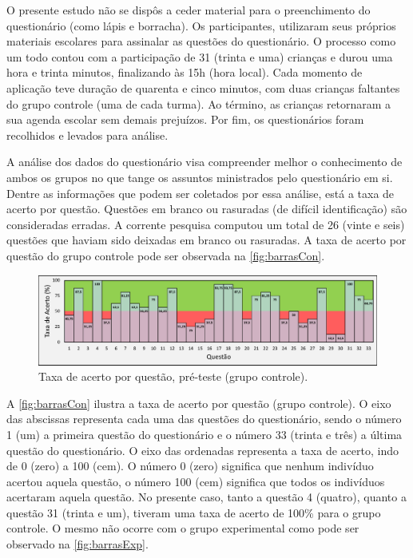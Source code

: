 O presente estudo não se dispôs a ceder material para o preenchimento do questionário (como lápis e borracha). Os participantes, utilizaram seus próprios materiais escolares para assinalar as questões do questionário. O processo como um todo contou com a participação de 31 (trinta e uma) crianças e durou uma hora e trinta minutos, finalizando às 15h (hora local). Cada momento de aplicação teve duração de quarenta e cinco minutos, com duas crianças faltantes do grupo controle (uma de cada turma). Ao término, as crianças retornaram a sua agenda escolar sem demais prejuízos. Por fim, os questionários foram recolhidos e levados para análise.

A análise dos dados do questionário visa compreender melhor o conhecimento de ambos os grupos no que tange os assuntos ministrados pelo questionário em si. Dentre as informações que podem ser coletados por essa análise, está a taxa de acerto por questão. Questões em branco ou rasuradas (de difícil identificação) são consideradas erradas. A corrente pesquisa computou um total de 26 (vinte e seis) questões que haviam sido deixadas em branco ou rasuradas. A taxa de acerto por questão do grupo controle pode ser observada na \autoref{fig:barrasCon}.

\begin{figure}[htb]

    \caption{\label{fig:barrasCon}Taxa de acerto por questão, pré-teste (grupo controle).}
    \includegraphics[width=\linewidth]{./Visuais/Notas4.pdf}
  
\end{figure}

A \autoref{fig:barrasCon} ilustra a taxa de acerto por questão (grupo controle). O eixo das abscissas representa cada uma das questões do questionário, sendo o número 1 (um) a primeira questão do questionário e o número 33 (trinta e três) a última questão do questionário. O eixo das ordenadas representa a taxa de acerto, indo de 0 (zero) a 100 (cem). O número 0 (zero) significa que nenhum indivíduo acertou aquela questão, o número 100 (cem) significa que todos os indivíduos acertaram aquela questão. No presente caso, tanto a questão 4 (quatro), quanto a questão 31 (trinta e um), tiveram uma taxa de acerto de 100\% para o grupo controle. O mesmo não ocorre com o grupo experimental como pode ser observado na \autoref{fig:barrasExp}.

